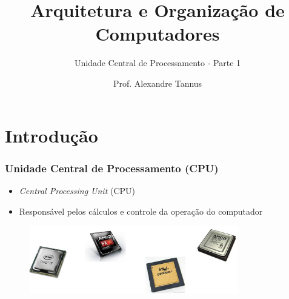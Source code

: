 \documentclass[aspectratio=169,
				xcolor=table]{beamer}
\title[]{Arquitetura e Organização de Computadores}
\subtitle[]{Unidade Central de Processamento - Parte 1}
\author[]{Prof. Alexandre Tannus}
\date{}
\begin{document}
	\begin{frame}
		\titlepage
	\end{frame}

	\begin{frame}
		\tableofcontents		
	\end{frame}	
	
	\section{Introdução}
	\begin{frame}
		\frametitle{Unidade Central de Processamento (CPU)}
		\begin{itemize}
			\item \textit{Central Processing Unit} (CPU)
			\vspace{1em}
			\item Responsável pelos cálculos e controle da operação do computador

		\end{itemize}
		\begin{figure}
			\includegraphics[height=3cm, keepaspectratio]{../figs/cap05/processadores.png} 
		\end{figure}
	\end{frame}
	
\end{document}
